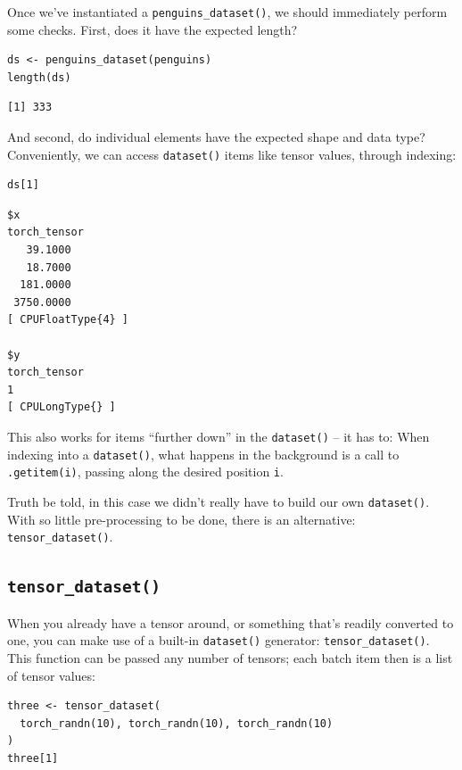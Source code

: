 \documentclass[
  letterpaper,
]{krantz}
\begin{document}
Once we've instantiated a \texttt{penguins\_dataset()}, we should
immediately perform some checks. First, does it have the expected
length?

\begin{verbatim}
ds <- penguins_dataset(penguins)
length(ds)
\end{verbatim}

\begin{verbatim}
[1] 333
\end{verbatim}

And second, do individual elements have the expected shape and data
type? Conveniently, we can access \texttt{dataset()} items like tensor
values, through indexing:

\begin{verbatim}
ds[1]
\end{verbatim}

\begin{verbatim}
$x
torch_tensor
   39.1000
   18.7000
  181.0000
 3750.0000
[ CPUFloatType{4} ]

$y
torch_tensor
1
[ CPULongType{} ]
\end{verbatim}

This also works for items ``further down'' in the \texttt{dataset()} --
it has to: When indexing into a \texttt{dataset()}, what happens in the
background is a call to \texttt{.getitem(i)}, passing along the desired
position \texttt{i}.

Truth be told, in this case we didn't really have to build our own
\texttt{dataset()}. With so little pre-processing to be done, there is
an alternative: \texttt{tensor\_dataset()}.

\hypertarget{tensor_dataset}{%
\subsection{\texorpdfstring{\texttt{tensor\_dataset()}}{tensor\_dataset()}}\label{tensor_dataset}}

When you already have a tensor around, or something that's readily
converted to one, you can make use of a built-in \texttt{dataset()}
generator: \texttt{tensor\_dataset()}. This function can be passed any
number of tensors; each batch item then is a list of tensor values:

\begin{verbatim}
three <- tensor_dataset(
  torch_randn(10), torch_randn(10), torch_randn(10)
)
three[1]
\end{verbatim}
\end{document}
